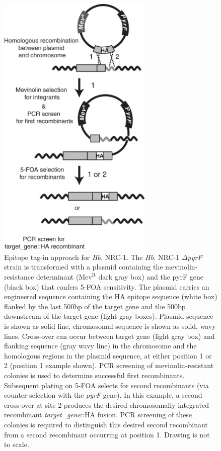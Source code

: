 \begin{figure}
\centering
\includegraphics[width=20em]{SaltyBugs/figures/fig1}
\caption{Epitope tag-in approach for {\em Hb.} NRC-1. The {\em Hb.} NRC-1 $\Delta${\em pyrF} strain is transformed with a plasmid containing the mevinolin-resistance determinant ($\mbox{Mev}^\mbox{R}$ dark gray box) and the pyrF gene (black box) that confers 5-FOA sensitivity. The plasmid carries an engineered sequence containing the HA epitope sequence (white box) flanked by the last 500bp of the target gene and the 500bp downstream of the target gene (light gray boxes). Plasmid sequence is shown as solid line, chromosomal sequence is shown as solid, wavy lines. Cross-over can occur between target gene (light gray box) and flanking sequence (gray wavy line) in the chromosome and the homologous regions in the plasmid sequence, at either position 1 or 2 (position 1 example shown). PCR screening of mevinolin-resistant colonies is used to determine successful first recombinants. Subsequent plating on 5-FOA selects for second recombinants (via counter-selection with the {\em pyrF} gene). In this example, a second cross-over at site 2 produces the desired chromosomally integrated recombinant {\em target\_gene}::HA fusion. PCR screening of these colonies is required to distinguish this desired second recombinant from a second recombinant occurring at position 1. Drawing is not to scale.}
\label{SB_fig1}
\end{figure}

